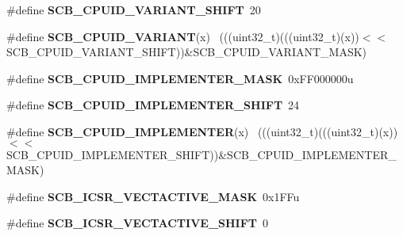 \begin{DoxyCompactItemize}
\item 
\hypertarget{group___s_c_b___register___masks_ga810d19688c9813a71a60087f8ad98b2f}{}\#define {\bfseries S\+C\+B\+\_\+\+C\+P\+U\+I\+D\+\_\+\+V\+A\+R\+I\+A\+N\+T\+\_\+\+S\+H\+I\+F\+T}~20\label{group___s_c_b___register___masks_ga810d19688c9813a71a60087f8ad98b2f}

\item 
\hypertarget{group___s_c_b___register___masks_ga5893cc47868f7ce5410fc210cb28e56f}{}\#define {\bfseries S\+C\+B\+\_\+\+C\+P\+U\+I\+D\+\_\+\+V\+A\+R\+I\+A\+N\+T}(x)                                      ~(((uint32\+\_\+t)(((uint32\+\_\+t)(x))$<$$<$S\+C\+B\+\_\+\+C\+P\+U\+I\+D\+\_\+\+V\+A\+R\+I\+A\+N\+T\+\_\+\+S\+H\+I\+F\+T))\&S\+C\+B\+\_\+\+C\+P\+U\+I\+D\+\_\+\+V\+A\+R\+I\+A\+N\+T\+\_\+\+M\+A\+S\+K)\label{group___s_c_b___register___masks_ga5893cc47868f7ce5410fc210cb28e56f}

\item 
\hypertarget{group___s_c_b___register___masks_gab1f83660e1dfa68aeccfed5a890725a9}{}\#define {\bfseries S\+C\+B\+\_\+\+C\+P\+U\+I\+D\+\_\+\+I\+M\+P\+L\+E\+M\+E\+N\+T\+E\+R\+\_\+\+M\+A\+S\+K}~0x\+F\+F000000u\label{group___s_c_b___register___masks_gab1f83660e1dfa68aeccfed5a890725a9}

\item 
\hypertarget{group___s_c_b___register___masks_ga6729af9d9ed3840dae99f10bb2feb44d}{}\#define {\bfseries S\+C\+B\+\_\+\+C\+P\+U\+I\+D\+\_\+\+I\+M\+P\+L\+E\+M\+E\+N\+T\+E\+R\+\_\+\+S\+H\+I\+F\+T}~24\label{group___s_c_b___register___masks_ga6729af9d9ed3840dae99f10bb2feb44d}

\item 
\hypertarget{group___s_c_b___register___masks_gab0fb7e28b04f21790b271cc997368c35}{}\#define {\bfseries S\+C\+B\+\_\+\+C\+P\+U\+I\+D\+\_\+\+I\+M\+P\+L\+E\+M\+E\+N\+T\+E\+R}(x)                              ~(((uint32\+\_\+t)(((uint32\+\_\+t)(x))$<$$<$S\+C\+B\+\_\+\+C\+P\+U\+I\+D\+\_\+\+I\+M\+P\+L\+E\+M\+E\+N\+T\+E\+R\+\_\+\+S\+H\+I\+F\+T))\&S\+C\+B\+\_\+\+C\+P\+U\+I\+D\+\_\+\+I\+M\+P\+L\+E\+M\+E\+N\+T\+E\+R\+\_\+\+M\+A\+S\+K)\label{group___s_c_b___register___masks_gab0fb7e28b04f21790b271cc997368c35}

\item 
\hypertarget{group___s_c_b___register___masks_ga5818ac6e0642a5053dd525d82623054b}{}\#define {\bfseries S\+C\+B\+\_\+\+I\+C\+S\+R\+\_\+\+V\+E\+C\+T\+A\+C\+T\+I\+V\+E\+\_\+\+M\+A\+S\+K}~0x1\+F\+Fu\label{group___s_c_b___register___masks_ga5818ac6e0642a5053dd525d82623054b}

\item 
\hypertarget{group___s_c_b___register___masks_ga02696369c8528292cf4f41897d83b156}{}\#define {\bfseries S\+C\+B\+\_\+\+I\+C\+S\+R\+\_\+\+V\+E\+C\+T\+A\+C\+T\+I\+V\+E\+\_\+\+S\+H\+I\+F\+T}~0\label{group___s_c_b___register___masks_ga02696369c8528292cf4f41897d83b156}


\end{DoxyCompactItemize}
